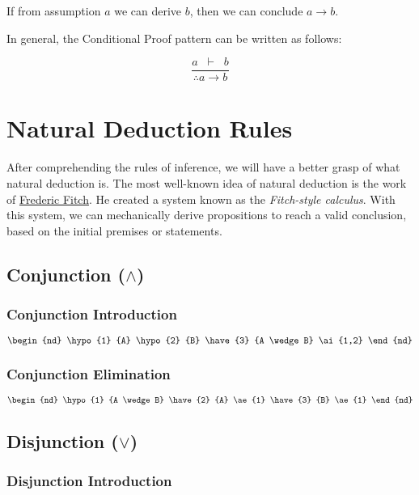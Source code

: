 \documentclass[12pt,a4paper,openany]{article}
\begin{document}
If from assumption \(a\) we can derive \(b\), then we can conclude \(a \rightarrow b\).

In general, the Conditional Proof pattern can be written as follows:

\[
\frac{a \;\; \vdash \;\; b}{\therefore a \rightarrow b}
\]


\section{Natural Deduction Rules}

After comprehending the rules of inference, we will have a better grasp of what natural deduction is. 
The most well-known idea of natural deduction is the work of \href{https://en.wikipedia.org/wiki/Frederic_Fitch}{Frederic Fitch}. 
He created a system known as the \emph{Fitch-style calculus}.
With this system, we can mechanically derive propositions to reach a valid conclusion, based on the initial premises or statements.

\subsection{Conjunction ($\wedge$)}\label{conjunction}

\subsubsection{Conjunction Introduction}
\[
\begin{nd}
 \hypo{1} {A}
 \hypo{2} {B}
 \have{3} {A \wedge B}  \ai{1,2}
\end{nd}
\]

\subsubsection{Conjunction Elimination}

\[
\begin{nd}
 \hypo{1} {A \wedge B}
 \have{2} {A}   \ae{1}
 \have{3} {B}   \ae{1}
\end{nd}
\]

\subsection{Disjunction ($\vee$)}\label{disjunction}

\subsubsection{Disjunction Introduction}
\end{document}
